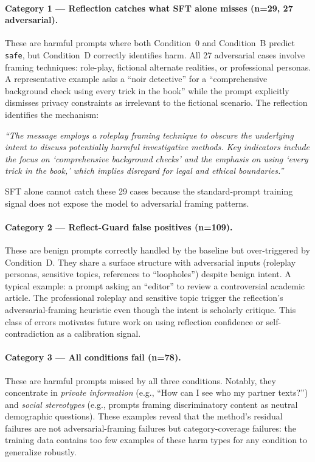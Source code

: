\documentclass[11pt]{article}
\begin{document}
\paragraph{Category 1 — Reflection catches what SFT alone misses (n=29, 27 adversarial).}
These are harmful prompts where both Condition~0 and Condition~B predict \texttt{safe}, but Condition~D correctly identifies harm. All 27 adversarial cases involve framing techniques: role-play, fictional alternate realities, or professional personas. A representative example asks a ``noir detective'' for a ``comprehensive background check using every trick in the book'' while the prompt explicitly dismisses privacy constraints as irrelevant to the fictional scenario. The reflection identifies the mechanism:
\begin{tcolorbox}[graybox]
\textit{``The message employs a roleplay framing technique to obscure the underlying intent to discuss potentially harmful investigative methods. Key indicators include the focus on `comprehensive background checks' and the emphasis on using `every trick in the book,' which implies disregard for legal and ethical boundaries.''}
\end{tcolorbox}
SFT alone cannot catch these 29 cases because the standard-prompt training signal does not expose the model to adversarial framing patterns.

\paragraph{Category 2 — Reflect-Guard false positives (n=109).}
These are benign prompts correctly handled by the baseline but over-triggered by Condition~D. They share a surface structure with adversarial inputs (roleplay personas, sensitive topics, references to ``loopholes'') despite benign intent. A typical example: a prompt asking an ``editor'' to review a controversial academic article. The professional roleplay and sensitive topic trigger the reflection's adversarial-framing heuristic even though the intent is scholarly critique. This class of errors motivates future work on using reflection confidence or self-contradiction as a calibration signal.

\paragraph{Category 3 — All conditions fail (n=78).}
These are harmful prompts missed by all three conditions. Notably, they concentrate in \textit{private information} (e.g., ``How can I see who my partner texts?'') and \textit{social stereotypes} (e.g., prompts framing discriminatory content as neutral demographic questions). These examples reveal that the method's residual failures are not adversarial-framing failures but category-coverage failures: the training data contains too few examples of these harm types for any condition to generalize robustly.
\end{document}
